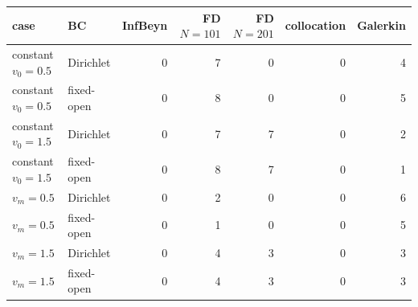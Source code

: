 \begin{tabular}{llrrrrr}
\toprule
case & BC & InfBeyn & FD $N{=}101$ & FD $N{=}201$ & collocation & Galerkin\\
\midrule
constant $v_0=0.5$ & Dirichlet & 0 & 7 & 0 & 0 & 4\\
constant $v_0=0.5$ & fixed-open & 0 & 8 & 0 & 0 & 5\\
constant $v_0=1.5$ & Dirichlet & 0 & 7 & 7 & 0 & 2\\
constant $v_0=1.5$ & fixed-open & 0 & 8 & 7 & 0 & 1\\
$v_m=0.5$ & Dirichlet & 0 & 2 & 0 & 0 & 6\\
$v_m=0.5$ & fixed-open & 0 & 1 & 0 & 0 & 5\\
$v_m=1.5$ & Dirichlet & 0 & 4 & 3 & 0 & 3\\
$v_m=1.5$ & fixed-open & 0 & 4 & 3 & 0 & 3\\
\bottomrule
\end{tabular}
